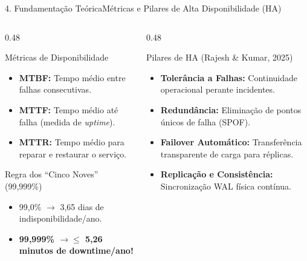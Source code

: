 \documentclass[aspectratio=169,10pt]{beamer}
\begin{document}
\begin{frame}{4. Fundamentação Teórica}{Métricas e Pilares de Alta Disponibilidade (HA)}
  \begin{columns}[t]
    \begin{column}{0.48\textwidth}
      \begin{block}{Métricas de Disponibilidade}
        \begin{itemize}
          \item \textbf{MTBF:} Tempo médio entre falhas consecutivas.
          \item \textbf{MTTF:} Tempo médio até falha (medida de \textit{uptime}).
          \item \textbf{MTTR:} Tempo médio para reparar e restaurar o serviço.
        \end{itemize}
      \end{block}
      \begin{exampleblock}{Regra dos ``Cinco Noves'' (99,999\%)}
        \begin{itemize}
          \item 99,0\% $\rightarrow$ 3,65 dias de indisponibilidade/ano.
          \item \textbf{99,999\% $\rightarrow \le$ 5,26 minutos de downtime/ano!}
        \end{itemize}
      \end{exampleblock}
    \end{column}
    \begin{column}{0.48\textwidth}
      \begin{block}{Pilares de HA (Rajesh \& Kumar, 2025)}
        \begin{itemize}
          \item \textbf{Tolerância a Falhas:} Continuidade operacional perante incidentes.
          \item \textbf{Redundância:} Eliminação de pontos únicos de falha (SPOF).
          \item \textbf{Failover Automático:} Transferência transparente de carga para réplicas.
          \item \textbf{Replicação e Consistência:} Sincronização WAL física contínua.
        \end{itemize}
      \end{block}
    \end{column}
  \end{columns}
\end{frame}
\end{document}
